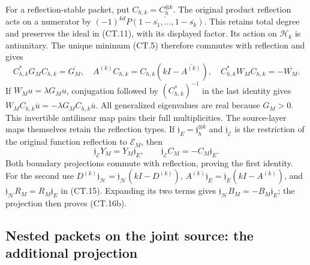 For a reflection-stable packet, put \(C_{h,k}=C_h^{\otimes k}\).
The original product reflection acts on a numerator by
\((-1)^{kd}\overline{P(1-\overline{s_1},\ldots,
1-\overline{s_k})}\).  This retains total degree and preserves
the ideal in (CT.11), with its displayed factor.  Its action on
\(\mathcal H_k\) is antiunitary.  The unique minimum (CT.5)
therefore commutes with reflection and gives
\[
 C_{h,k}^*G_MC_{h,k}=\overline{G_M},\quad
 A^{(k)}C_{h,k}=C_{h,k}(kI-\overline{A^{(k)}}),\quad
 C_{h,k}^*W_MC_{h,k}=-\overline{W_M}.                    \tag{CT.16a}
\]
If \(W_Mu=\lambda G_Mu\), conjugation followed by
\((C_{h,k}^*)^{-1}\) in the last identity gives
\(W_MC_{h,k}\overline u=-\lambda G_MC_{h,k}\overline u\).
All generalized eigenvalues are real because \(G_M>0\).
This invertible antilinear map pairs their full multiplicities.
The source-layer maps themselves retain the reflection types.  If
\(\mathfrak j_E=\mathfrak j_h^{\otimes k}\) and
\(\mathfrak j_{\mathcal E}\) is the restriction of the
original function reflection to \(\mathcal E_M\), then
\[
 \mathfrak j_{\mathcal E}Y_M=Y_M\mathfrak j_E,
 \qquad \mathfrak j_{\mathcal E}C_M=-C_M\mathfrak j_E.
 \tag{CT.16b}
\]
Both boundary projections commute with reflection, proving the first
identity.  For the second use
\(D^{(k)}\mathfrak j_{\mathcal H}
=\mathfrak j_{\mathcal H}(kI-D^{(k)})\),
\(A^{(k)}\mathfrak j_E=\mathfrak j_E(kI-A^{(k)})\),
and \(\mathfrak j_{\mathcal H}R_M=R_M\mathfrak j_E\)
in (CT.15).  Expanding its two terms gives
\(\mathfrak j_{\mathcal H}B_M=-B_M\mathfrak j_E\);
the projection then proves (CT.16b).

\subsection{Nested packets on the joint source: the additional projection}

